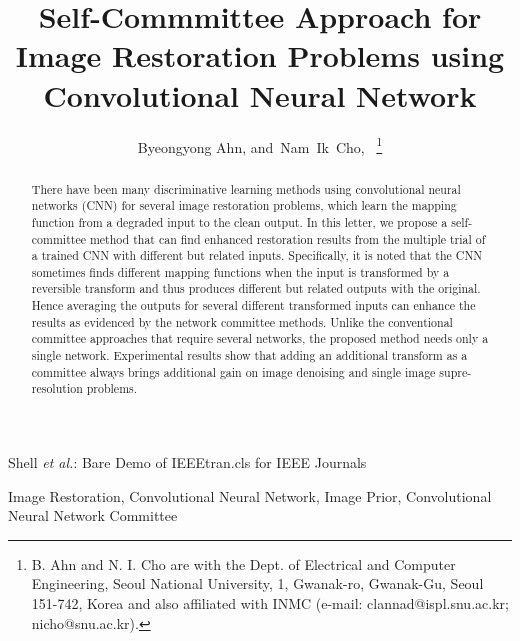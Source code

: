\documentclass[journal]{IEEEtran}
\begin{document}
\title{Self-Commmittee Approach for Image Restoration Problems using 
Convolutional Neural Network}

\author{Byeongyong Ahn,
	and~Nam~Ik~Cho,~
\thanks{B. Ahn and N. I. Cho are with the Dept. of Electrical and Computer Engineering, Seoul National University,
	1, Gwanak-ro, Gwanak-Gu, Seoul 151-742, Korea and also
	affiliated with INMC
	(e-mail: clannad@ispl.snu.ac.kr; nicho@snu.ac.kr).}}

%
{Shell \MakeLowercase{\textit{et al.}}: Bare Demo of IEEEtran.cls for IEEE Journals}

\maketitle

\begin{abstract}
There have been many discriminative learning methods 
using convolutional neural networks (CNN) for several
image restoration problems, which learn the
mapping function from a degraded input to the clean output.
In this letter, we propose a self-committee method that can
find enhanced restoration results from the multiple trial of
a trained CNN with different but related inputs.
Specifically, it is noted that the CNN sometimes finds
different mapping functions when the input is transformed
by a reversible transform and thus produces different
but related outputs with the original. Hence averaging
the outputs for several different transformed inputs
can enhance the results as evidenced by the network
committee methods. Unlike the conventional committee approaches
that require several networks, the proposed method
needs only a single network.
Experimental results show that adding an additional transform as a committee
always brings additional gain on image denoising and single image
supre-resolution problems.
\end{abstract}

\begin{IEEEkeywords}
Image Restoration, Convolutional Neural Network, Image Prior, 
Convolutional Neural Network Committee
\end{IEEEkeywords}

\IEEEpeerreviewmaketitle
\end{document}
